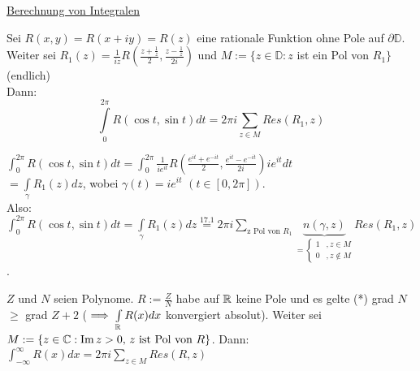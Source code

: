 \documentclass[a4paper,twoside,DIV15,BCOR12mm]{scrbook}
\def\wegint{\ensuremath{\int\limits_\gamma}}
\def\iint{\ensuremath{\int\limits}}
\begin{document}
\underline{Berechnung von Integralen}
\begin{satz}
  Sei $R(x,y)= R(x+iy) = R(z)$ eine rationale Funktion ohne Pole auf $\partial\mathbb{D}$. Weiter sei 
  $R_1(z)=\frac{1}{iz}R(\frac{z+\frac{1}{z}}{2},\frac{z-\frac{1}{z}}{2i})$ und $M:=\{z\in\mathbb{D}:z$ ist ein Pol von $R_1\}$ (endlich)\\
  Dann:
  $$ \int\limits_0^{2\pi}R(\cos{t},\sin{t})dt=2\pi i \sum\limits_{z\in M} Res(R_1,z)$$
\end{satz}
\begin{beweis}

  $\iint_0^{2\pi}R(\cos{t},\sin{t})dt = \iint_0^{2\pi}\frac{1}{ie^{it}} R(\frac{e^{it}+e^{-it}}{2},\frac{e^{it}-e^{-it}}{2i}) ie^{it}dt$\\
  $= \wegint R_1(z)dz$, wobei $\gamma(t)=ie^{it}$ $(t\in[0,2\pi])$.\\
  Also: $\iint_0^{2\pi}R(\cos{t},\sin{t})dt = \wegint R_1(z)dz \stackrel{17.1}{=}2\pi i \sum\limits_{\text{z Pol von $R_1$}} \underbrace{n(\gamma, z)}_{
    =
     \begin{cases} 
       1 & , z \in M \\ 
       0 & ,z \not\in M
     \end{cases}
  }  Res(R_1,z)$.
\end{beweis}
\begin{satz}
  $Z$ und $N$ seien Polynome. $R:=\frac{Z}{N}$ habe auf $\mathbb{R}$ keine Pole und es gelte (*) grad $N$ $\ge$ grad $Z+2$ ($\folgt \iint_\MdR R(x)dx$ konvergiert absolut). 
  Weiter sei $M:=\{z\in\mathbb{C}: \mathop{\rm Im}\nolimits z >0\text{, } z\text{ ist Pol von }R\}$. Dann:\\
  $\iint_{-\infty}^\infty R(x) dx = 2\pi i \sum\limits_{z\in M} Res(R,z)$
\end{satz}
\end{document}
